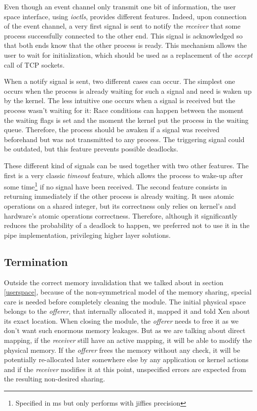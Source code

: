 \documentclass[journal]{IEEEtran}
\begin{document}
Even though an event channel only transmit one bit of information, the user space interface, using \emph{ioctls}, provides different features. Indeed, upon connection of the event channel, a very first signal is sent to notify the \emph{receiver} that some process successfully connected to the other end. This signal is acknowledged so that both ends know that the other process is ready. This mechanism allows the user to wait for initialization, which should be used as a replacement of the \emph{accept} call of TCP sockets.

When a notify signal is sent, two different cases can occur.
The simplest one occurs when the process is already waiting for such a signal and need is waken up by the kernel.
The less intuitive one occurs when a signal is received but the process wasn't waiting for it:
Race conditions can happen between the moment the waiting flags is set and the moment the kernel put the process in the waiting queue.
Therefore, the process should be awaken if a signal was received beforehand but was not transmitted to any process. The triggering signal could be outdated, but this feature prevents possible deadlocks.

These different kind of signals can be used together with two other features. The first is a very classic \emph{timeout} feature, which allows the process to wake-up after some time\footnote{Specified in ms but only performs with jiffies precision} if no signal have been received. The second feature consists in returning immediately if the other process is already waiting. It uses atomic operations on a shared integer, but its correctness only relies on kernel's and hardware's atomic operations correctness. Therefore, although it significantly reduces the probability of a deadlock to happen, we preferred not to use it in the pipe implementation, privileging higher layer solutions.

\subsection{Termination}
\label{Termination}

Outside the correct memory invalidation that we talked about in section \ref{userspace}, because of the non-symmetrical model of the memory sharing, special care is needed before completely cleaning the module. The initial physical space belongs to the \emph{offerer}, that internally allocated it, mapped it and told Xen about its exact location. When closing the module, the \emph{offerer} needs to free it as we don't want such enormous memory leakages. But as we are talking about direct mapping, if the \emph{receiver} still have an active mapping, it will be able to modify the physical memory.
If the \emph{offerer} frees the memory without any check, it will be potentially re-allocated later somewhere else by any application or kernel actions and if the \emph{receiver} modifies it at this point, unspecified errors are expected from the resulting non-desired sharing.
\end{document}
